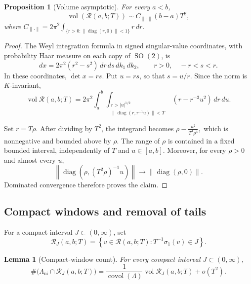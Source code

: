 \documentclass[reqno,11pt]{amsart}
\newtheorem{prop}[prop]{Proposition}
\newtheorem{lem}[lem]{Lemma}
\theoremstyle{definition}
\theoremstyle{remark}
\numberwithin{equation}{section}
\newcommand{\SO}{\operatorname{SO}}
\newcommand{\vol}{\operatorname{vol}}
\newcommand{\covol}{\operatorname{covol}}
\begin{document}
\begin{prop}[Volume asymptotic]
\label{prop:volume-d2}
For every $a<b$,
$$
\vol\left(\mathcal R(a,b;T)\right)
\sim
C_{\|\cdot\|}(b-a)T^2,
$$
where
$
C_{\|\cdot\|}
=
2\pi^2
\int_{\{r>0:\|\operatorname{diag}(r,0)\|<1\}}
r\,dr.
$
\end{prop}

\begin{proof}
The Weyl integration formula in signed singular-value coordinates, with
probability Haar measure on each copy of $\SO(2)$, is
$$
dx
=
2\pi^2(r^2-s^2)\,dr\,ds\,dk_1\,dk_2,
\qquad
r>0,\quad -r<s<r.
$$
In these coordinates, $\det x=rs$. Put $u=rs$, so that
$s=u/r$. Since the norm is $K$-invariant,
$$
\vol\mathcal R(a,b;T)
=
2\pi^2
\int_a^b
\int_{\substack{r>|u|^{1/2}\\
\|\operatorname{diag}(r,r^{-1}u)\|<T}}
\left(r-r^{-3}{u^2}\right)\,dr\,du.
$$

Set $r=T\rho$. After dividing by $T^2$, the integrand becomes
$
\rho-\frac{u^2}{T^4\rho^3},
$
which is nonnegative and bounded above by $\rho$. The
range of $\rho$ is contained in a fixed bounded interval, independently of
$T$ and $u\in[a,b]$. Moreover, for every $\rho>0$ and almost every $u$,
$$
\left\|
\operatorname{diag}
\left(\rho,({T^2\rho})^{-1} u\right)
\right\|
\to
\|\operatorname{diag}(\rho,0)\|.
$$
Dominated convergence therefore proves the claim.
\end{proof}

\subsection{Compact windows and removal of tails}

For a compact interval $J\subset(0,\infty)$, set
$$
\mathcal R_J(a,b;T)
=
\left\{
v\in\mathcal R(a,b;T):
T^{-1}{\sigma_1(v)}\in J
\right\}.
$$

\begin{lem}[Compact-window count]
\label{lem:compact-window-counting-d2}
For every compact interval $J\subset(0,\infty)$,
$$
\#\bigl(\Lambda_{\operatorname{ni}}\cap\mathcal R_J(a,b;T)\bigr)
=
\frac{1}{\covol(\Lambda)}
\vol\mathcal R_J(a,b;T)
+
o(T^2).
$$
\end{lem}
\end{document}
